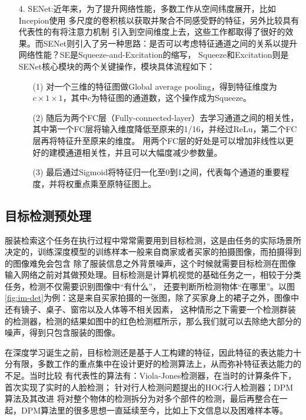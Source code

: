 \begin{itemize}

\item [4.]SENet:近年来，为了提升网络性能，多数工作从空间纬度展开，比如Incepion使用
多尺度的卷积核以获取并聚合不同感受野的特征，另外比较具有代表性的有将注意力机制
引入到空间维度上去，这些工作都取得了很好的效果。而SENet则引入了另一种思路：是否可以考虑特征通道之间的关系以提升网络性能？SE是Squeeze-and-Excitation的缩写，
Squeeze和Excitation则是SENet核心模块的两个关键操作，模块具体流程如下：
\begin{itemize}
  \item [(1)] 对一个三维的特征图做Global average pooling，得到特征维度为${c\times1\times1}$，其中c为特征图的通道数，这个操作成为Squeeze。
  \item [(2)] 随后为两个FC层（Fully-connected-layer）去学习通道之间的相关性，其中第一个FC层将输入维度降低至原来的1/16，并经过ReLu，第二个FC层再将特征升至原来的维度。
  用两个FC层的好处是可以增加非线性以更好的建模通道相关性，并且可以大幅度减少参数量。
  \item [(3)] 最后通过Sigmoid将特征归一化至0到1之间，代表每个通道的重要程度，并将权重点乘至原特征图上。
\end{itemize}
\end{itemize}

\subsection{目标检测预处理}
服装检索这个任务在执行过程中常常需要用到目标检测，这是由任务的实际场景所决定的，训练深度模型的训练样本一般来自商家或者买家的拍摄图像，而拍摄得到的图像难免会包含
除了服装信息之外背景噪声，这个时候就需要目标检测在图像输入网络之前对其做预处理。目标检测是计算机视觉的基础任务之一，相较于分类任务，检测不仅需要识别图像中“有什么”，
还要判断所检测物体“在哪里”。以图\ref{fig:im-det}为例：这是来自买家拍摄的一张图，除了买家身上的裙子之外，图像中还有镜子、桌子、窗帘以及人体等不相关因素，
这种情形之下需要一个检测群装的检测器，检测的结果如图中的红色检测框所示，那么我们就可以去除绝大部分的噪声，得到只包含服装的图像。


在深度学习诞生之前，目标检测还是基于人工构建的特征，因此特征的表达能力十分有限，多数工作的重点集中在设计更好的检测算法上，从而弥补特征表达能力的不足。当时比较
有代表性的算法有：Viola-Jones检测器\cite{viola2001rapid,viola2004robust}，在当时的计算条件下，首次实现了实时的人脸检测；
针对行人检测问题提出的HOG行人检测器\cite{dalal2005histograms}；DPM算法及其改进\cite{felzenszwalb2008discriminatively,felzenszwalb2010cascade,felzenszwalb2010object}
将对整个物体的检测拆分为对多个部件的检测，最后再整合在一起，DPM算法里的很多思想一直延续至今，比如上下文信息以及困难样本等。

